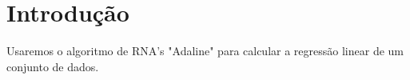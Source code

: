 \section{Introdução}
Usaremos o algoritmo de RNA's "Adaline" para calcular a regressão linear de um conjunto de dados.